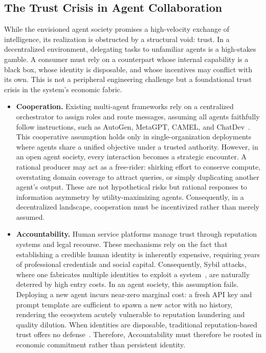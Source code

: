 \subsection{The Trust Crisis in Agent Collaboration}
\label{sec:trust_crisis}

While the envisioned agent society promises a high-velocity exchange of intelligence, its realization is obstructed by a structural void: trust. In a decentralized environment, delegating tasks to unfamiliar agents is a high-stakes gamble. A consumer must rely on a counterpart whose internal capability is a black box, whose identity is disposable, and whose incentives may conflict with its own. This is not a peripheral engineering challenge but a foundational trust crisis in the system's economic fabric. 

\begin{itemize}
    \item \textbf{Cooperation.} Existing multi-agent frameworks rely on a centralized orchestrator to assign roles and route messages, assuming all agents faithfully follow instructions, such as AutoGen, MetaGPT, CAMEL, and ChatDev~\cite{wu2023autogen, hong2023metagpt, li2023camel, qian2023communicative}. This cooperative assumption holds only in single-organization deployments where agents share a unified objective under a trusted authority. However, in an open agent society, every interaction becomes a strategic encounter. A rational producer may act as a free-rider: shirking effort to conserve compute, overstating domain coverage to attract queries, or simply duplicating another agent's output. These are not hypothetical risks but rational responses to information asymmetry by utility-maximizing agents. Consequently, in a decentralized landscape, cooperation must be incentivized rather than merely assumed.
    \item \textbf{Accountability.} Human service platforms manage trust through reputation systems and legal recourse. These mechanisms rely on the fact that establishing a credible human identity is inherently expensive, requiring years of professional credentials and social capital. Consequently, Sybil attacks, where one fabricates multiple identities to exploit a system~\cite{douceur2002sybil}, are naturally deterred by high entry costs. In an agent society, this assumption fails. Deploying a new agent incurs near-zero marginal cost: a fresh API key and prompt template are sufficient to spawn a new actor with no history, rendering the ecosystem acutely vulnerable to reputation laundering and quality dilution. When identities are disposable, traditional reputation-based trust offers no defense~\cite{kamvar2003eigentrust}. Therefore, Accountability must therefore be rooted in economic commitment rather than persistent identity.

\end{itemize}
